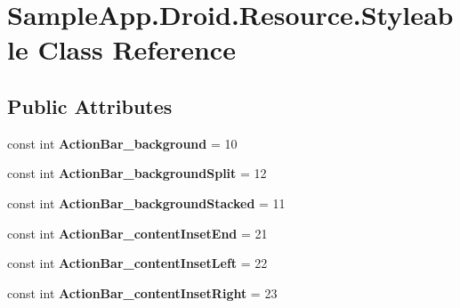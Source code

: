 \hypertarget{class_sample_app_1_1_droid_1_1_resource_1_1_styleable}{}\section{Sample\+App.\+Droid.\+Resource.\+Styleable Class Reference}
\label{class_sample_app_1_1_droid_1_1_resource_1_1_styleable}
\subsection*{Public Attributes}
\begin{DoxyCompactItemize}
\item 
\mbox{\label{class_sample_app_1_1_droid_1_1_resource_1_1_styleable_a30a91db240797e2e8afa251886350764}} 
const int {\bfseries Action\+Bar\+\_\+background} = 10
\item 
\mbox{\label{class_sample_app_1_1_droid_1_1_resource_1_1_styleable_ac6a27bff6dd54f5cf816be2fc7e6d429}} 
const int {\bfseries Action\+Bar\+\_\+background\+Split} = 12
\item 
\mbox{\label{class_sample_app_1_1_droid_1_1_resource_1_1_styleable_a07fe5946c1a7f592e74f9a7abc21f79e}} 
const int {\bfseries Action\+Bar\+\_\+background\+Stacked} = 11
\item 
\mbox{\label{class_sample_app_1_1_droid_1_1_resource_1_1_styleable_a57742bb8a02d9d6c8eeb0b32e1fecf15}} 
const int {\bfseries Action\+Bar\+\_\+content\+Inset\+End} = 21
\item 
\mbox{\label{class_sample_app_1_1_droid_1_1_resource_1_1_styleable_a83619aa2eaf673e62afcd4490a0d5b4f}} 
const int {\bfseries Action\+Bar\+\_\+content\+Inset\+Left} = 22
\item 
\mbox{\label{class_sample_app_1_1_droid_1_1_resource_1_1_styleable_af458e6249509cf26276ac59a1b04b208}} 
const int {\bfseries Action\+Bar\+\_\+content\+Inset\+Right} = 23

\end{DoxyCompactItemize}
